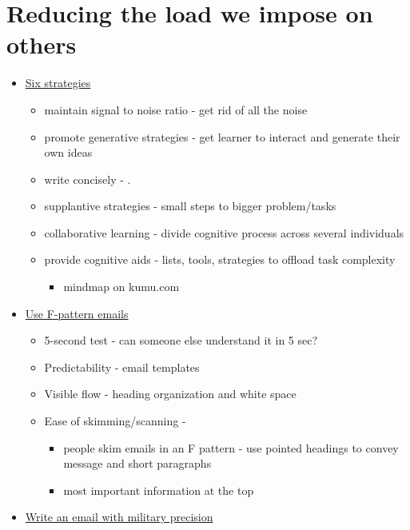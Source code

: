\documentclass[
  letterpaper,
  DIV=11,
  numbers=noendperiod]{scrreprt}
\providecommand{\tightlist}{%
  \setlength{\itemsep}{0pt}\setlength{\parskip}{0pt}}\usepackage{longtable,booktabs,array}
\begin{document}
\hypertarget{reducing-the-load-we-impose-on-others}{%
\section*{\texorpdfstring{\textbf{Reducing the load we impose on
others}}{Reducing the load we impose on others}}\label{reducing-the-load-we-impose-on-others}}

\begin{itemize}
\item
  \href{http://theelearningcoach.com/learning/reduce-cognitive-load/}{Six
  strategies}

  \begin{itemize}
  \item
    maintain signal to noise ratio - get rid of all the noise
  \item
    promote generative strategies - get learner to interact and generate
    their own ideas
  \item
    write concisely - .
  \item
    supplantive strategies - small steps to bigger problem/tasks
  \item
    collaborative learning - divide cognitive process across several
    individuals
  \item
    provide cognitive aids - lists, tools, strategies to offload task
    complexity

    \begin{itemize}
    \tightlist
    \item
      mindmap on kumu.com
    \end{itemize}
  \end{itemize}
\item
  \href{https://blog.bananatag.com/internal-comms/cognitive-load-impact-on-internal-emails}{Use
  F-pattern emails}

  \begin{itemize}
  \item
    5-second test - can someone else understand it in 5 sec?
  \item
    Predictability - email templates
  \item
    Visible flow - heading organization and white space
  \item
    Ease of skimming/scanning -

    \begin{itemize}
    \item
      people skim emails in an F pattern - use pointed headings to
      convey message and short paragraphs
    \item
      most important information at the top
    \end{itemize}
  \end{itemize}
\item
  \href{https://hbr.org/2016/11/how-to-write-email-with-military-precision}{Write
  an email with military precision}


\end{itemize}
\end{document}
